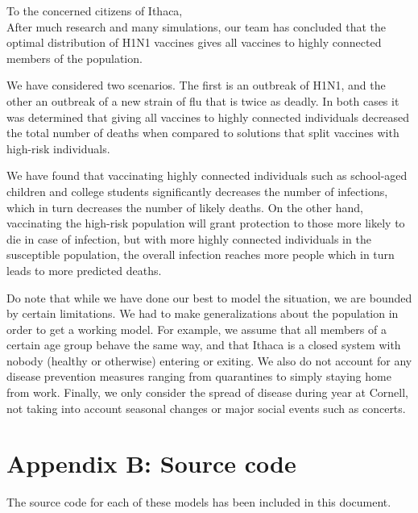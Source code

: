 \documentclass[titlepage]{article}
\begin{document}
To the concerned citizens of Ithaca,\\
After much research and many simulations, our team has concluded that the optimal distribution of H1N1 vaccines gives all vaccines to highly connected members of the population.

We have considered two scenarios. The first is an outbreak of H1N1, and the other an outbreak of a new strain of flu that is twice as deadly. In both cases it was determined that giving all vaccines to highly connected individuals decreased the total number of deaths when compared to solutions that split vaccines with high-risk individuals.

We have found that vaccinating highly connected individuals such as school-aged children and college students significantly decreases the number of infections, which in turn decreases the number of likely deaths. On the other hand, vaccinating the high-risk population will grant protection to those more likely to die in case of infection, but with more highly connected individuals in the susceptible population, the overall infection reaches more people which in turn leads to more predicted deaths.

Do note that while we have done our best to model the situation, we are bounded by certain limitations. We had to make generalizations about the population in order to get a working model. For example, we assume that all members of a certain age group behave the same way, and that Ithaca is a closed system with nobody (healthy or otherwise) entering or exiting. We also do not account for any disease prevention measures ranging from quarantines to simply staying home from work. Finally, we only consider the spread of disease during year at Cornell, not taking into account seasonal changes or major social events such as concerts.

\section{Appendix B: Source code}
The source code for each of these models has been included in this document.
\end{document}
